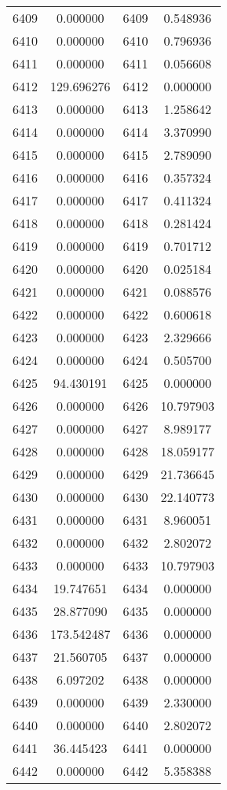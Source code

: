 \documentclass[12pt]{article}
\begin{document}
\begin{longtable}{@{}cccc@{}}
6409 & 0.000000 & 6409 & 0.548936 \\
6410 & 0.000000 & 6410 & 0.796936 \\
6411 & 0.000000 & 6411 & 0.056608 \\
6412 & 129.696276 & 6412 & 0.000000 \\
6413 & 0.000000 & 6413 & 1.258642 \\
6414 & 0.000000 & 6414 & 3.370990 \\
6415 & 0.000000 & 6415 & 2.789090 \\
6416 & 0.000000 & 6416 & 0.357324 \\
6417 & 0.000000 & 6417 & 0.411324 \\
6418 & 0.000000 & 6418 & 0.281424 \\
6419 & 0.000000 & 6419 & 0.701712 \\
6420 & 0.000000 & 6420 & 0.025184 \\
6421 & 0.000000 & 6421 & 0.088576 \\
6422 & 0.000000 & 6422 & 0.600618 \\
6423 & 0.000000 & 6423 & 2.329666 \\
6424 & 0.000000 & 6424 & 0.505700 \\
6425 & 94.430191 & 6425 & 0.000000 \\
6426 & 0.000000 & 6426 & 10.797903 \\
6427 & 0.000000 & 6427 & 8.989177 \\
6428 & 0.000000 & 6428 & 18.059177 \\
6429 & 0.000000 & 6429 & 21.736645 \\
6430 & 0.000000 & 6430 & 22.140773 \\
6431 & 0.000000 & 6431 & 8.960051 \\
6432 & 0.000000 & 6432 & 2.802072 \\
6433 & 0.000000 & 6433 & 10.797903 \\
6434 & 19.747651 & 6434 & 0.000000 \\
6435 & 28.877090 & 6435 & 0.000000 \\
6436 & 173.542487 & 6436 & 0.000000 \\
6437 & 21.560705 & 6437 & 0.000000 \\
6438 & 6.097202 & 6438 & 0.000000 \\
6439 & 0.000000 & 6439 & 2.330000 \\
6440 & 0.000000 & 6440 & 2.802072 \\
6441 & 36.445423 & 6441 & 0.000000 \\
6442 & 0.000000 & 6442 & 5.358388 \\

\end{longtable}
\end{document}
